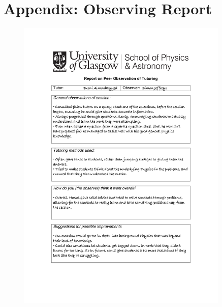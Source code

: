 \documentclass[12pt,avenir,a4paper,final]{iopart}
\begin{document}
\section*{Appendix: Observing Report}
\begin{figure}[htbp]
\begin{center}
\includegraphics[width=0.9\textwidth]{feedback}
\end{center}
\end{figure}
\end{document}
